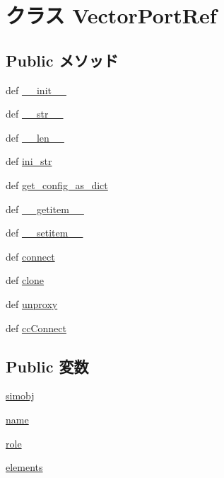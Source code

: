 \hypertarget{classm5_1_1params_1_1VectorPortRef}{
\section{クラス VectorPortRef}
\label{classm5_1_1params_1_1VectorPortRef}
}
\subsection*{Public メソッド}
\begin{DoxyCompactItemize}
\item 
def \hyperlink{classm5_1_1params_1_1VectorPortRef_ac775ee34451fdfa742b318538164070e}{\_\-\_\-init\_\-\_\-}
\item 
def \hyperlink{classm5_1_1params_1_1VectorPortRef_aa7a4b9bc0941308e362738503137460e}{\_\-\_\-str\_\-\_\-}
\item 
def \hyperlink{classm5_1_1params_1_1VectorPortRef_af6412d48d9a71eac81e3195b52455aaa}{\_\-\_\-len\_\-\_\-}
\item 
def \hyperlink{classm5_1_1params_1_1VectorPortRef_a33ebe6cd32bcbd15465fc28b9d94bf82}{ini\_\-str}
\item 
def \hyperlink{classm5_1_1params_1_1VectorPortRef_ab1772c0da7b9e12819e1c0373513c53c}{get\_\-config\_\-as\_\-dict}
\item 
def \hyperlink{classm5_1_1params_1_1VectorPortRef_a50d766f4276c3d8fe330ac8cd344a75f}{\_\-\_\-getitem\_\-\_\-}
\item 
def \hyperlink{classm5_1_1params_1_1VectorPortRef_a09195b01147e970ca71c48b57f653940}{\_\-\_\-setitem\_\-\_\-}
\item 
def \hyperlink{classm5_1_1params_1_1VectorPortRef_a0f3e881a92d7a1b4d6d07d9e63180c98}{connect}
\item 
def \hyperlink{classm5_1_1params_1_1VectorPortRef_a4110248fff184e40b53c1cfa2bc3c649}{clone}
\item 
def \hyperlink{classm5_1_1params_1_1VectorPortRef_a587cd3c1e899640dc09d63793aa8093b}{unproxy}
\item 
def \hyperlink{classm5_1_1params_1_1VectorPortRef_addaf6e2a0c3ee33ece43bba237efcd7d}{ccConnect}
\end{DoxyCompactItemize}
\subsection*{Public 変数}
\begin{DoxyCompactItemize}
\item 
\hyperlink{classm5_1_1params_1_1VectorPortRef_a5fccb54db416603de9f73682d34ea092}{simobj}
\item 
\hyperlink{classm5_1_1params_1_1VectorPortRef_ab74e6bf80237ddc4109968cedc58c151}{name}
\item 
\hyperlink{classm5_1_1params_1_1VectorPortRef_a4e0cdb878325d53ad79a74504bf97a96}{role}
\item 
\hyperlink{classm5_1_1params_1_1VectorPortRef_aa9aaa650bacb9b91c82437c2ce48f50c}{elements}
\end{DoxyCompactItemize}
